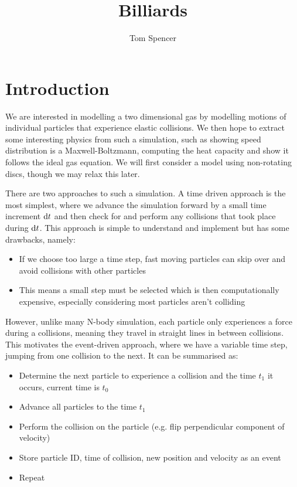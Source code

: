 \documentclass{article}
\title{Billiards}
\author{Tom Spencer}
\newcommand{\diff}{\textnormal{d}}
\begin{document}
\maketitle

\section{Introduction}
We are interested in modelling a two dimensional gas by modelling motions of individual particles that experience elastic collisions. We then hope to extract some interesting physics from such a simulation, such as showing speed distribution is a Maxwell-Boltzmann, computing the heat capacity and show it follows the ideal gas equation. We will first consider a model using non-rotating discs, though we may relax this later.

There are two approaches to such a simulation. A time driven approach is the most simplest, where we advance the simulation forward by a small time increment $\diff t$ and then check for and perform any collisions that took place during $\diff t$. This approach is simple to understand and implement but has some drawbacks, namely:
\begin{itemize}
    \item If we choose too large a time step, fast moving particles can skip over and avoid collisions with other particles
    \item This means a small step must be selected which is then computationally expensive, especially considering most particles aren't colliding
\end{itemize}

However, unlike many N-body simulation, each particle only experiences a force during a collisions, meaning they travel in straight lines in between collisions. This motivates the event-driven approach, where we have a variable time step, jumping from one collision to the next. It can be summarised as:
\begin{itemize}
    \item Determine the next particle to experience a collision and the time $t_1$ it occurs, current time is $t_0$
    \item Advance all particles to the time $t_1$
    \item Perform the collision on the particle (e.g. flip perpendicular component of velocity)
    \item Store particle ID, time of collision, new position and velocity as an event
    \item Repeat
\end{itemize}
\end{document}
